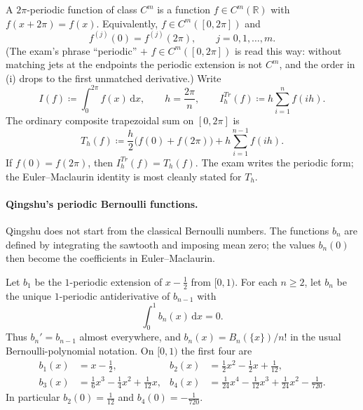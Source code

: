 \begin{definition}
\label{def:p1-periodic}
A \(2\pi\)-periodic function of class \(C^{m}\) is a function \(f\in C^{m}(\mathbb{R})\) with \(f(x+2\pi)=f(x)\). Equivalently, \(f\in C^{m}([0,2\pi])\) and
\[
f^{(j)}(0)
=
f^{(j)}(2\pi),
\qquad
j=0,1,\dots,m.
\]
(The exam's phrase ``periodic'' \(+\) \(f\in C^{m}([0,2\pi])\) is read this way: without matching jets at the endpoints the periodic extension is not \(C^{m}\), and the order in (i) drops to the first unmatched derivative.) Write
\[
I(f)
\coloneqq
\int_{0}^{2\pi} f(x)\,\mathrm{d}x,
\qquad
h
=
\frac{2\pi}{n},
\qquad
I_{h}^{Tr}(f)
\coloneqq
h\sum_{i=1}^{n} f(ih).
\]
The ordinary composite trapezoidal sum on \([0,2\pi]\) is
\begin{equation}
\label{eq:p1-ordinary-trap}
T_{h}(f)
\coloneqq
\frac{h}{2}\bigl(f(0)+f(2\pi)\bigr)
+
h\sum_{i=1}^{n-1} f(ih).
\end{equation}
If \(f(0)=f(2\pi)\), then \(I_{h}^{Tr}(f)=T_{h}(f)\). The exam writes the periodic form; the Euler--Maclaurin identity is most cleanly stated for \(T_{h}\).
\end{definition}

\paragraph{Qingshu's periodic Bernoulli functions.}

Qingshu does not start from the classical Bernoulli numbers. The functions \(b_{n}\) are defined by integrating the sawtooth and imposing mean zero; the values \(b_{n}(0)\) then become the coefficients in Euler--Maclaurin.

\begin{definition}
\label{def:p1-bn}
Let \(b_{1}\) be the \(1\)-periodic extension of \(x-\tfrac12\) from \([0,1)\). For each \(n\ge 2\), let \(b_{n}\) be the unique \(1\)-periodic antiderivative of \(b_{n-1}\) with
\[
\int_{0}^{1} b_{n}(x)\,\mathrm{d}x
=
0.
\]
Thus \(b_{n}'=b_{n-1}\) almost everywhere, and \(b_{n}(x)=B_{n}(\{x\})/n!\) in the usual Bernoulli-polynomial notation. On \([0,1)\) the first four are
\begin{align*}
b_{1}(x)
&=
x-\tfrac12,
&
b_{2}(x)
&=
\tfrac12 x^{2}-\tfrac12 x+\tfrac{1}{12},
\\
b_{3}(x)
&=
\tfrac16 x^{3}-\tfrac14 x^{2}+\tfrac{1}{12}x,
&
b_{4}(x)
&=
\tfrac{1}{24}x^{4}-\tfrac{1}{12}x^{3}+\tfrac{1}{24}x^{2}-\tfrac{1}{720}.
\end{align*}
In particular \(b_{2}(0)=\frac{1}{12}\) and \(b_{4}(0)=-\frac{1}{720}\).
\end{definition}

